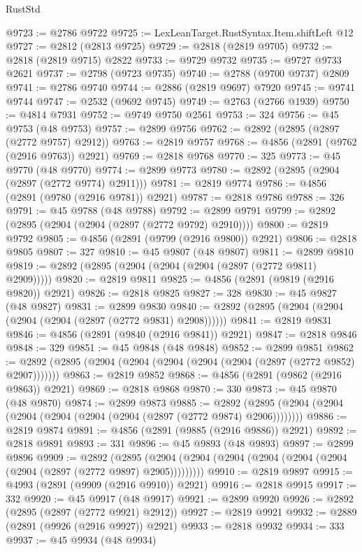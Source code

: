 \begin{lexlean}{RustStd}
\begin{coremodule}
@9723 := @2786 @9722
@9725 := LexLeanTarget.RustSyntax.Item.shiftLeft @12
@9727 := @2812 (@2813 @9725)
@9729 := @2818 (@2819 @9705)
@9732 := @2818 (@2819 @9715) @2822
@9733 := @9729 @9732
@9735 := @9727 @9733 @2621
@9737 := @2798 (@9723 @9735)
@9740 := @2788 (@9700 @9737) @2809
@9741 := @2786 @9740
@9744 := @2886 (@2819 @9697) @7920
@9745 := @9741 @9744
@9747 := @2532 (@9692 @9745)
@9749 := @2763 (@2766 @1939)
@9750 := @4814 @7931
@9752 := @9749 @9750 @2561
@9753 := 324
@9756 := @45 @9753 (@48 @9753)
@9757 := @2899 @9756
@9762 := @2892 (@2895 (@2897 (@2772 @9757) @2912))
@9763 := @2819 @9757
@9768 := @4856 (@2891 (@9762 (@2916 @9763)) @2921)
@9769 := @2818 @9768
@9770 := 325
@9773 := @45 @9770 (@48 @9770)
@9774 := @2899 @9773
@9780 := @2892 (@2895 (@2904 (@2897 (@2772 @9774) @2911)))
@9781 := @2819 @9774
@9786 := @4856 (@2891 (@9780 (@2916 @9781)) @2921)
@9787 := @2818 @9786
@9788 := 326
@9791 := @45 @9788 (@48 @9788)
@9792 := @2899 @9791
@9799 := @2892 (@2895 (@2904 (@2904 (@2897 (@2772 @9792) @2910))))
@9800 := @2819 @9792
@9805 := @4856 (@2891 (@9799 (@2916 @9800)) @2921)
@9806 := @2818 @9805
@9807 := 327
@9810 := @45 @9807 (@48 @9807)
@9811 := @2899 @9810
@9819 := @2892 (@2895 (@2904 (@2904 (@2904 (@2897 (@2772 @9811) @2909)))))
@9820 := @2819 @9811
@9825 := @4856 (@2891 (@9819 (@2916 @9820)) @2921)
@9826 := @2818 @9825
@9827 := 328
@9830 := @45 @9827 (@48 @9827)
@9831 := @2899 @9830
@9840 := @2892 (@2895 (@2904 (@2904 (@2904 (@2904 (@2897 (@2772 @9831) @2908))))))
@9841 := @2819 @9831
@9846 := @4856 (@2891 (@9840 (@2916 @9841)) @2921)
@9847 := @2818 @9846
@9848 := 329
@9851 := @45 @9848 (@48 @9848)
@9852 := @2899 @9851
@9862 := @2892 (@2895 (@2904 (@2904 (@2904 (@2904 (@2904 (@2897 (@2772 @9852) @2907)))))))
@9863 := @2819 @9852
@9868 := @4856 (@2891 (@9862 (@2916 @9863)) @2921)
@9869 := @2818 @9868
@9870 := 330
@9873 := @45 @9870 (@48 @9870)
@9874 := @2899 @9873
@9885 := @2892 (@2895 (@2904 (@2904 (@2904 (@2904 (@2904 (@2904 (@2897 (@2772 @9874) @2906))))))))
@9886 := @2819 @9874
@9891 := @4856 (@2891 (@9885 (@2916 @9886)) @2921)
@9892 := @2818 @9891
@9893 := 331
@9896 := @45 @9893 (@48 @9893)
@9897 := @2899 @9896
@9909 := @2892
    (@2895 (@2904 (@2904 (@2904 (@2904 (@2904 (@2904 (@2904 (@2897 (@2772 @9897) @2905)))))))))
@9910 := @2819 @9897
@9915 := @4993 (@2891 (@9909 (@2916 @9910)) @2921)
@9916 := @2818 @9915
@9917 := 332
@9920 := @45 @9917 (@48 @9917)
@9921 := @2899 @9920
@9926 := @2892 (@2895 (@2897 (@2772 @9921) @2912))
@9927 := @2819 @9921
@9932 := @2889 (@2891 (@9926 (@2916 @9927)) @2921)
@9933 := @2818 @9932
@9934 := 333
@9937 := @45 @9934 (@48 @9934)

\end{coremodule}
\end{lexlean}
